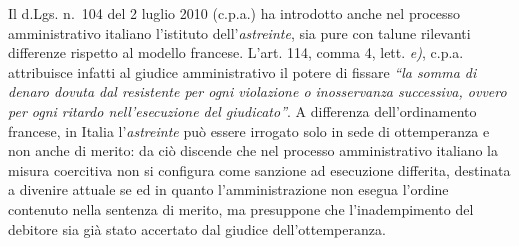\documentclass[12pt,it,a4paper,]{report}
\begin{document}
Il d.Lgs. n.~104 del 2 luglio 2010 (c.p.a.) ha introdotto anche nel
processo amministrativo italiano l'istituto dell'\emph{astreinte}, sia
pure con talune rilevanti differenze rispetto al modello francese.
L'art. 114, comma 4, lett. \emph{e)}, c.p.a. attribuisce infatti al
giudice amministrativo il potere di fissare \emph{``la somma di denaro
dovuta dal resistente per ogni violazione o inosservanza successiva,
ovvero per ogni ritardo nell'esecuzione del giudicato''}. A differenza
dell'ordinamento francese, in Italia l'\emph{astreinte} può essere
irrogato solo in sede di ottemperanza e non anche di merito: da ciò
discende che nel processo amministrativo italiano la misura coercitiva
non si configura come sanzione ad esecuzione differita, destinata a
divenire attuale se ed in quanto l'amministrazione non esegua l'ordine
contenuto nella sentenza di merito, ma presuppone che l'inadempimento
del debitore sia già stato accertato dal giudice dell'ottemperanza.
\end{document}
